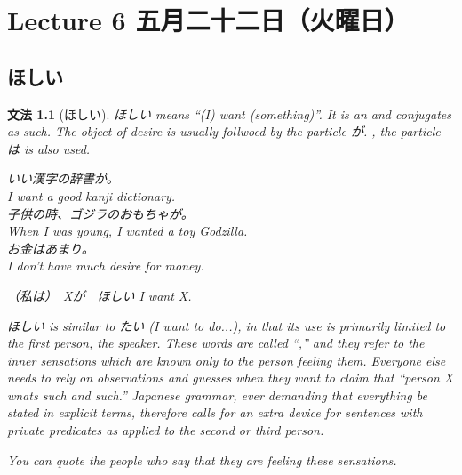 \documentclass[notoc,notitlepage]{tufte-book}
\newtheorem{grammar}{文法}[section]
\begin{document}

\chapter{Lecture 6 五月二十二日（火曜日）}%
\label{chp:lecture_6_wu_yue_er_shi_er_ri_huo_yao_ri_}

\section{ほしい}
\label{sec:hoshii}

\begin{grammar}[ほしい]
\label{grammar:hoshii}
  ほしい means ``(I) want (something)''. It is an  and conjugates as such. The object of desire is usually follwoed by the particle が. , the particle は is also used.

  いい漢字の辞書が。\\
  I want a good kanji dictionary. \\
  子供の時、ゴジラのおもちゃが。\\
  When I was young, I wanted a toy Godzilla. \\
  お金はあまり。\\
  I don't have much desire for money.

  \begin{center}
    （私は）　Xが　ほしい \qquad I want X.
  \end{center}

  \noindent ほしい is similar to たい (I want to do...), in that its use is primarily limited to the first person, the speaker. These words are called ``,'' and they refer to the inner sensations which are known only to the person feeling them. Everyone else needs to rely on observations and guesses when they want to claim that ``person X wnats such and such.'' Japanese grammar, ever demanding that everything be stated in explicit terms, therefore calls for an extra device for sentences with private predicates as applied to the second or third person.

  \noindent You can quote the people who say that they are feeling these sensations.


\end{grammar}
\end{document}
